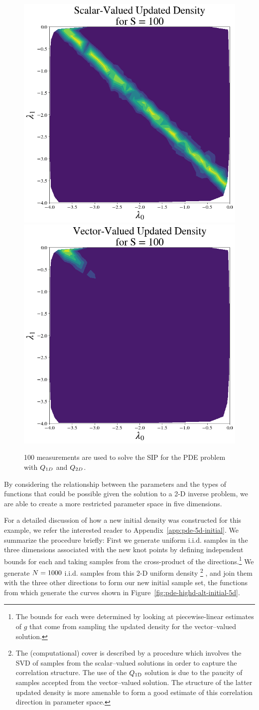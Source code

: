 \begin{figure}
\centering
  \includegraphics[width=0.45\linewidth]{figures/pde-highd/pde-highd_updated_D2_scalar.png}
  \includegraphics[width=0.45\linewidth]{figures/pde-highd/pde-highd_updated_D2_vector.png}
\caption{
100 measurements are used to solve the SIP for the PDE problem with $Q_{1D}$ and $Q_{2D}$.
}
\label{fig:pde-highd-2d-updated}
\end{figure}

By considering the relationship between the parameters and the types of functions that could be possible given the solution to a 2-D inverse problem, we are able to create a more restricted parameter space in five dimensions.

For a detailed discussion of how a new initial density was constructed for this example, we refer the interested reader to Appendix~\ref{app:pde-5d-initial}.
We summarize the procedure briefly:
First we generate uniform i.i.d. samples in the three dimensions associated with the new knot points by defining independent bounds for each and taking samples from the cross-product of the directions.\footnote{
The bounds for each were determined by looking at piecewise-linear estimates of $g$ that come from sampling the updated density for the vector--valued solution.
}
We generate $N=1000$ i.i.d. samples from this 2-D uniform density
\footnote{
The (computational) cover is described by a procedure which involves the SVD of samples from the scalar--valued solutions in order to capture the correlation structure.
The use of the $Q_\text{1D}$ solution is due to the paucity of samples accepted from the vector--valued solution.
The structure of the latter updated density is more amenable to form a good estimate of this correlation direction in parameter space.
}
, and join them with the three other directions to form our new initial sample set, the functions from which generate the curves shown in Figure~\ref{fig:pde-highd-alt-initial-5d}.

